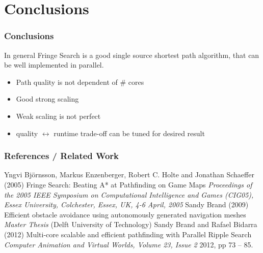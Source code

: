 \documentclass{beamer}
\begin{document}
\section{Conclusions}
\begin{frame}
\frametitle{Conclusions}
In general Fringe Search is a good single source shortest path algorithm, that can be well implemented in parallel.\\
\begin{itemize}
\item Path quality is not dependent of \# cores
\item Good strong scaling
\item Weak scaling is not perfect
\item quality $\leftrightarrow$ runtime trade-off can be tuned for desired result
\end{itemize}
\end{frame}



\begin{frame}
\frametitle{References / Related Work}
\footnotesize{
\begin{thebibliography}{99} %
 Yngvi Björnsson, Markus Enzenberger, Robert C. Holte and Jonathan Schaeffer (2005)
\newblock Fringe Search: Beating A* at Pathfinding on Game Maps
\newblock \emph{Proceedings of the 2005 IEEE Symposium on Computational Intelligence and Games (CIG05), Essex University, Colchester, Essex, UK, 4-6 April, 2005}
 Sandy Brand (2009)
\newblock Efficient obstacle avoidance using autonomously generated navigation meshes
\newblock \emph{Master Thesis} (Delft University of Technology)
 Sandy Brand and Rafael Bidarra (2012)
\newblock Multi-core scalable and efficient pathfinding with
Parallel Ripple Search
\newblock \emph{Computer Animation and Virtual Worlds, Volume 23, Issue 2} 2012, pp 73 -- 85.
\end{thebibliography}
}
\end{frame}


%
\end{document}
